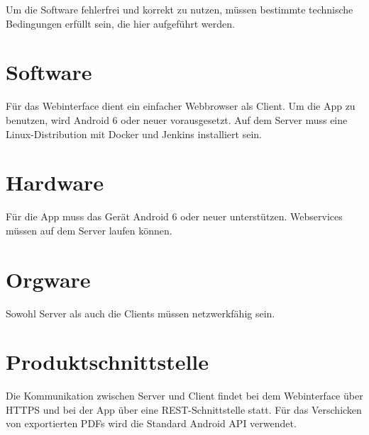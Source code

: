 Um die Software fehlerfrei und korrekt zu nutzen, müssen bestimmte technische Bedingungen erfüllt sein, die hier aufgeführt werden.

\section*{Software}

Für das Webinterface dient ein einfacher Webbrowser als Client.
Um die App zu benutzen, wird Android 6 oder neuer vorausgesetzt.
\newline
\newline
Auf dem Server muss eine Linux-Distribution mit Docker und Jenkins installiert sein.

\section*{Hardware}

Für die App muss das Gerät Android 6 oder neuer unterstützen.
\newline
\newline
Webservices müssen auf dem Server laufen können.


\section*{Orgware}

Sowohl Server als auch die Clients müssen netzwerkfähig sein.


\section*{Produktschnittstelle}

Die Kommunikation zwischen Server und Client findet bei dem Webinterface über HTTPS und bei der App über eine REST-Schnittstelle statt. Für das Verschicken von exportierten PDFs wird die Standard Android API verwendet.
